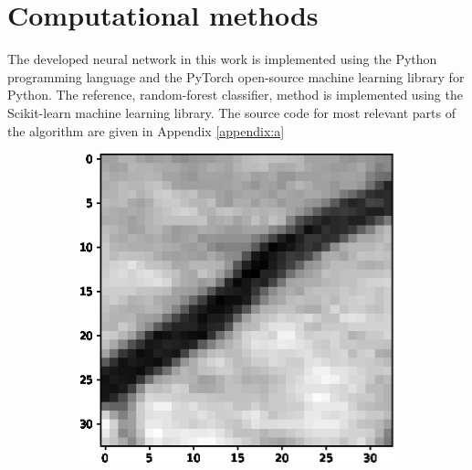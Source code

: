 \documentclass[aps,prb,10pt,twocolumn,groupedaddress]{revtex4-1}
\begin{document}
\section{Computational methods}
\label{sec:computational_methods}
The developed neural network in this work is implemented using the Python programming language and the PyTorch\cite{pytorch} open-source machine learning library for Python. The reference, random-forest classifier, method is implemented using the Scikit-learn machine learning library\cite{scikit-learn}. The source code for most relevant parts of the algorithm are given in Appendix \ref{appendix:a}
\begin{figure}[!t]
	\centering
	\begin{subfigure}[]{0.22\textwidth}
		\centering
		\includegraphics[width=\textwidth]{images/positive1.eps}
		\caption{}
	\end{subfigure}
	\hspace{1.55cm}
	\centering
	\begin{subfigure}[]{0.22\textwidth}
		\centering

\end{subfigure}
\end{figure}
\end{document}

